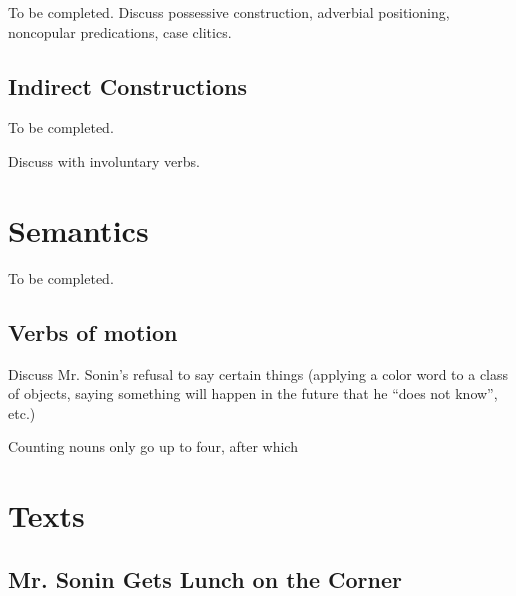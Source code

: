 \documentclass[pdftex,12pt,letterpaper]{article}
\let\ipa\textipa
\begin{document}
 To be completed. Discuss possessive construction, adverbial positioning, noncopular predications, case clitics.

 \subsection{Indirect Constructions}

 To be completed.

 Discuss \emph{\ipa{\textltailn e}} with involuntary verbs.

 \section{Semantics}

 To be completed.

 \subsection{Verbs of motion}

 Discuss Mr. Sonin's refusal to say certain things (applying a color word to a class of objects, saying something will happen in the future that he ``does not know'', etc.)

 Counting nouns only go up to four, after which 


 \pagebreak
 \section{Texts}

 \subsection{Mr. Sonin Gets Lunch on the Corner}
\end{document}
